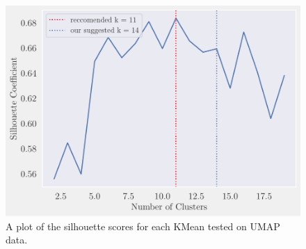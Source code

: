 \begin{figure}[H]
    \centering
    \includegraphics[width=0.9\linewidth]{examples/tests_eb/figs/kmean_sil.pdf}
    \caption{A plot of the silhouette scores for each KMean tested on UMAP data.}
    \label{fig_cumsumpca}
\end{figure}


